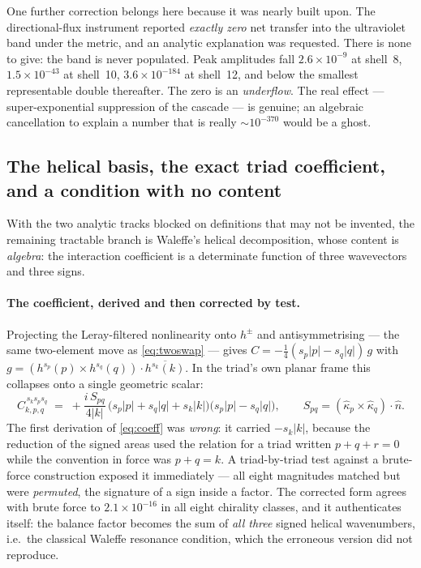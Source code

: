 \documentclass[11pt,a4paper]{article}
\theoremstyle{definition}
\theoremstyle{plain}
\begin{document}
One further correction belongs here because it was nearly built upon. The directional-flux
instrument reported \emph{exactly zero} net transfer into the ultraviolet band under the metric,
and an analytic explanation was requested. There is none to give: the band is never populated. Peak
amplitudes fall $2.6\times10^{-9}$ at shell~8, $1.5\times10^{-43}$ at shell~10,
$3.6\times10^{-184}$ at shell~12, and below the smallest representable double thereafter. The zero
is an \emph{underflow}. The real effect --- super-exponential suppression of the cascade --- is
genuine; an algebraic cancellation to explain a number that is really ${\sim}10^{-370}$ would be a
ghost.

\subsection{The helical basis, the exact triad coefficient, and a condition with no content}
\label{sec:waleffe}

With the two analytic tracks blocked on definitions that may not be invented, the remaining
tractable branch is Waleffe's helical decomposition, whose content is \emph{algebra}: the
interaction coefficient is a determinate function of three wavevectors and three signs.

\paragraph{The coefficient, derived and then corrected by test.}
Projecting the Leray-filtered nonlinearity onto $h^{\pm}$ and antisymmetrising --- the same
two-element move as \eqref{eq:twoswap} --- gives $C=-\tfrac14(s_p|p|-s_q|q|)\,g$ with
$g=(h^{s_p}(p)\times h^{s_q}(q))\cdot\overline{h^{s_k}(k)}$. In the triad's own planar frame this
collapses onto a single geometric scalar:
\begin{equation}
  C^{\,s_ks_ps_q}_{k,p,q}
   \;=\;+\frac{i\,S_{pq}}{4|k|}\,
     \bigl(s_p|p|+s_q|q|+s_k|k|\bigr)\bigl(s_p|p|-s_q|q|\bigr),
  \qquad S_{pq}=(\hat\kappa_p\times\hat\kappa_q)\cdot\hat n .
  \label{eq:coeff}
\end{equation}
The first derivation of \eqref{eq:coeff} was \emph{wrong}: it carried $-s_k|k|$, because the
reduction of the signed areas used the relation for a triad written $p+q+r=0$ while the convention
in force was $p+q=k$. A triad-by-triad test against a brute-force construction exposed it
immediately --- all eight magnitudes matched but were \emph{permuted}, the signature of a sign
inside a factor. The corrected form agrees with brute force to $2.1\times10^{-16}$ in all eight
chirality classes, and it authenticates itself: the balance factor becomes the sum of \emph{all
three} signed helical wavenumbers, i.e.\ the classical Waleffe resonance condition, which the
erroneous version did not reproduce.
\end{document}
